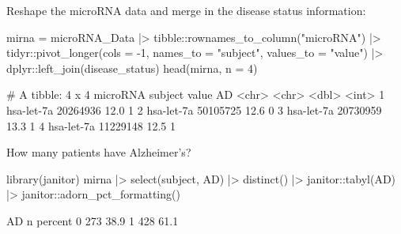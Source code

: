 \documentclass[a4paper]{article}
\begin{document}
Reshape the microRNA data and merge in the disease status information:
\begin{Schunk}
\begin{Sinput}
mirna = microRNA_Data |>
  tibble::rownames_to_column("microRNA") |> 
  tidyr::pivot_longer(cols = -1, names_to = "subject", values_to = "value") |> 
  dplyr::left_join(disease_status)
head(mirna, n = 4)
\end{Sinput}
\begin{Soutput}
# A tibble: 4 x 4
  microRNA   subject  value    AD
  <chr>      <chr>    <dbl> <int>
1 hsa-let-7a 20264936  12.0     1
2 hsa-let-7a 50105725  12.6     0
3 hsa-let-7a 20730959  13.3     1
4 hsa-let-7a 11229148  12.5     1
\end{Soutput}
\end{Schunk}
How many patients have Alzheimer's?
\begin{Schunk}
\begin{Sinput}
library(janitor)
mirna |> select(subject, AD) |> 
  distinct() |> 
  janitor::tabyl(AD) |> 
  janitor::adorn_pct_formatting()
\end{Sinput}
\begin{Soutput}
 AD   n percent
  0 273   38.9%
  1 428   61.1%
\end{Soutput}
\end{Schunk}
\end{document}

